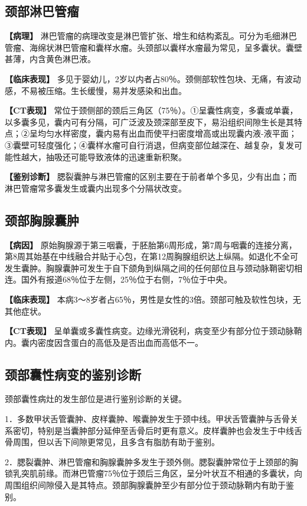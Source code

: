 \subsection{颈部淋巴管瘤}

\textbf{【病理】}
淋巴管瘤的病理改变是淋巴管扩张、增生和结构紊乱。可分为毛细淋巴管瘤、海绵状淋巴管瘤和囊样水瘤。头颈部以囊样水瘤最为常见，呈多囊状。囊壁甚薄，内含黄色淋巴液。

\textbf{【临床表现】}
多见于婴幼儿，2岁以内者占80％。颈侧部软性包块、无痛，有波动感，不易被压缩。生长缓慢，易并发感染和出血。

\textbf{【CT表现】}
常位于颈侧部的颈后三角区（75％）。①呈囊性病变，多囊或单囊，以多囊多见，囊内可有分隔，可广泛波及颈深部至皮下，易沿组织间隙生长是其特点；②呈均匀水样密度，囊内易有出血而使平扫密度增高或出现囊内液-液平面；③囊壁可轻度强化；④囊样水瘤可自行消退，但病变部位越深在、越复杂，复发可能性越大，抽吸还可能导致液体的迅速重新积聚。

\textbf{【鉴别诊断】}
腮裂囊肿与淋巴管瘤的区别主要在于前者单个多见，少有出血；而淋巴管瘤常多囊发生或囊内出现多个分隔状改变。

\subsection{颈部胸腺囊肿}

\textbf{【病因】}
原始胸腺源于第三咽囊，于胚胎第6周形成，第7周与咽囊的连接分离，第8周其始基在中线融合并贴于心包，在第12周胸腺组织达上纵隔。如退化不全可发生囊肿。胸腺囊肿可发生于自下颌角到纵隔之间的任何部位且与颈动脉鞘密切相连。国外有报道68％位于左侧，25％位于右侧，7％位于中央。

\textbf{【临床表现】}
本病3～8岁者占65％，男性是女性的3倍。颈部可触及软性包块，无其他症状。

\textbf{【CT表现】}
呈单囊或多囊性病变。边缘光滑锐利，病变至少有部分位于颈动脉鞘内。囊内密度因含蛋白的高低及是否出血而高低不一。

\subsection{颈部囊性病变的鉴别诊断}

颈部囊性病灶的发生部位是进行鉴别诊断的关键。

1．多数甲状舌管囊肿、皮样囊肿、喉囊肿发生于颈中线。甲状舌管囊肿与舌骨关系密切，特别是当囊肿部分延伸至舌骨后时更有意义。皮样囊肿也会发生于中线舌骨周围，但以舌下间隙更常见，且多含有脂肪有助于鉴别。

2．腮裂囊肿、淋巴管瘤和胸腺囊肿多发生于颈外侧。腮裂囊肿常位于上颈部的胸锁乳突肌前缘。而淋巴管瘤75％位于颈后三角区，呈分叶状互不相通的多囊状，向周围组织间隙侵入是其特点。颈部胸腺囊肿至少有部分位于颈动脉鞘内有助于鉴别。

